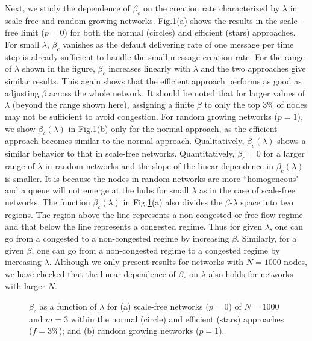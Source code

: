\documentclass[aps,prl,twocolumn,superscriptaddress,showpacs]{revtex4}
\begin{document}
Next, we study the dependence of $\beta_c$ on the creation rate
characterized by $\lambda$ in scale-free and random growing
networks.  Fig.\ref{fig4}(a) shows the results in the scale-free
limit ($p=0$) for both the normal (circles) and efficient (stars)
approaches. For small $\lambda$, $\beta_{c}$ vanishes as the
default delivering rate of one message per time step is already
sufficient to handle the small message creation rate.  For the
range of $\lambda$ shown in the figure, $\beta_{c}$ increases
linearly with $\lambda$ and the two approaches give similar
results.  This again shows that the efficient approach performs as
good as adjusting $\beta$ across the whole network. It should be
noted that for larger values of $\lambda$ (beyond the range shown
here), assigning a finite $\beta$ to only the top $3\%$ of nodes
may not be sufficient to avoid congestion.   For random growing
networks ($p=1$), we show $\beta_{c}(\lambda)$ in
Fig.\ref{fig4}(b) only for the normal approach, as the efficient
approach becomes similar to the normal approach.  Qualitatively,
$\beta_{c}(\lambda)$ shows a similar behavior to that in
scale-free networks.  Quantitatively, $\beta_{c}=0$ for a larger
range of $\lambda$ in random networks and the slope of the linear
dependence in $\beta_{c}(\lambda)$ is smaller.  It is because the
nodes in random networks are more ``homogeneous" and a queue will
not emerge at the hubs for small $\lambda$ as in the case of
scale-free networks.  The function $\beta_{c}(\lambda)$ in
Fig.\ref{fig4}(a) also divides the $\beta$-$\lambda$ space into
two regions.  The region above the line represents a non-congested
or free flow regime and that below the line represents a congested
regime. Thus for given $\lambda$, one can go from a congested to a
non-congested regime by increasing $\beta$.  Similarly, for a
given $\beta$, one can go from a non-congested regime to a
congested regime by increasing $\lambda$.  Although we only
present results for networks with $N=1000$ nodes, we have checked
that the linear dependence of $\beta_{c}$ on $\lambda$ also holds
for networks with larger $N$.

\begin{figure}
\begin{center}
 \caption{$\beta_c$
as a function of $\lambda$ for (a) scale-free networks ($p=0$) of
$N=1000$ and $m=3$ within the normal (circle) and efficient
(stars) approaches ($f=3\%$); and (b) random growing networks
($p=1$).} \label{fig4}
\end{center}
\end{figure}
\end{document}
